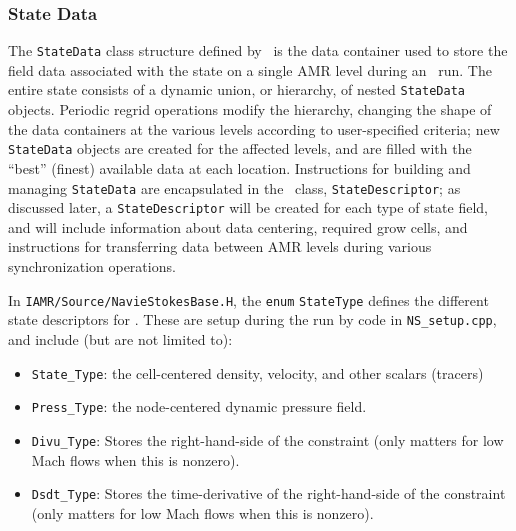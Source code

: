 


\subsubsection{State Data}

The {\tt StateData} class structure defined by \amrex\ is the data container
used to store the field data associated with the state on a single AMR level
during an \iamr\ run.  The entire state consists of a dynamic union, or hierarchy, of
nested {\tt StateData} objects.  Periodic regrid operations modify the hierarchy,
changing the shape of the data containers at the various levels according to
user-specified criteria; new {\tt StateData} objects are created
for the affected levels, and are filled with the ``best'' (finest) available 
data at each location. Instructions for building and managing {\tt StateData} are
encapsulated in the \amrex\ class, {\tt StateDescriptor}; as discussed later,
a {\tt StateDescriptor} will be created for each type of state field, and 
will include information about data centering, required grow cells, and
instructions for transferring data between AMR levels during various synchronization
operations.

In {\tt IAMR/Source/NavieStokesBase.H}, the {\tt enum} {\tt StateType} defines the
different state descriptors for \iamr.  These are setup during the
run by code in {\tt NS\_setup.cpp}, and include (but are not limited to):
\begin{itemize}
\item {\tt State\_Type}: the cell-centered density, velocity, and other scalars (tracers)
\item {\tt Press\_Type}: the node-centered dynamic pressure field.
\item {\tt Divu\_Type}: Stores the right-hand-side of the constraint 
(only matters for low Mach flows when this is nonzero).
\item {\tt Dsdt\_Type}: Stores the time-derivative of the right-hand-side of the constraint 
(only matters for low Mach flows when this is nonzero).
\end{itemize}

